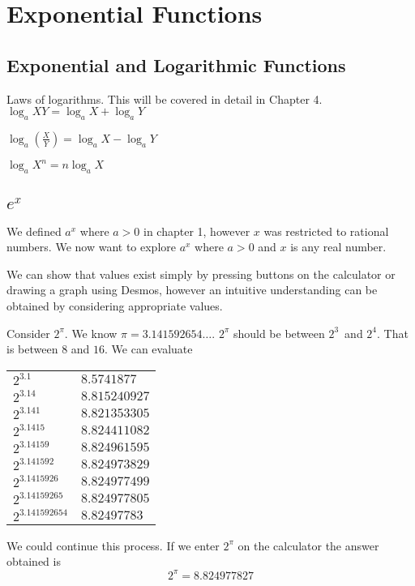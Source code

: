 \chapter{Exponential Functions}
\section{Exponential and Logarithmic Functions}
Laws of logarithms. This will be covered in detail in Chapter 4.\\
$\log _{a} X Y =\log _{a} X +\log _{a} Y$ 

$\log _{a} \genfrac{(}{)}{}{}{X}{Y} =\log _{a} X -\log _{a} Y$ 

$\log _{a} X^{n} =n \log _{a} X$ 


\section{$e^x$}
We defined $a^{x}$ where $a >0$ in chapter 1, however $x$ was restricted to rational numbers. We now want to explore $a^{x}$ where $a >0$ and $x$ is any real number. 

We can show that values exist simply by pressing buttons on the calculator or drawing
a graph using Desmos, however an intuitive understanding can be obtained by considering appropriate values. 

Consider $2^{\pi }$. We know $\pi  =3.141592654 \ldots $. $2^{\pi }$ should be between $2^{3}$\ and $2^{4}$. That is between $8$ and $16$. We can evaluate 

\qquad \qquad \qquad \qquad \qquad \qquad \qquad \qquad
\begin{tabular}[c]{ll}$2^{3.1}$  & $8.5741877$  \\
$2^{3.14}$  & $8.815240927$  \\
$2^{3.141}$  & $8.821353305$  \\
$2^{3.1415}$  & $8.824411082$  \\
$2^{3.14159}$  & $8.824961595$  \\
$2^{3.141592}$  & $8.824973829$  \\
$2^{3.1415926}$  & $8.824977499$  \\
$2^{3.14159265}$  & $8.824977805$  \\
$2^{3.141592654}$  & $8.82497783$
\end{tabular}

We could continue this process. If
we enter $2^{\pi }$ on the calculator the answer obtained is
\begin{equation*}2^{\pi } =8.824977827
\end{equation*}

